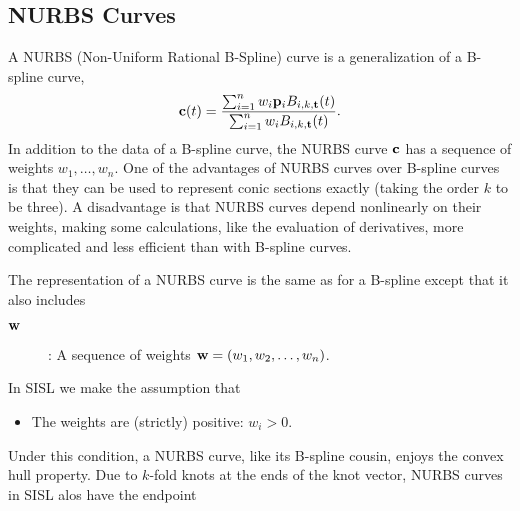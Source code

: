 \subsection{NURBS Curves}

A NURBS (Non-Uniform Rational B-Spline) curve is a generalization
of a B-spline curve,
$$ {\bf c}(t) = {\sum_{i=1}^{n} w_i {\bf p}_{i} B_{i,k,{\bf t}}(t)
                 \over
                 \sum_{i=1}^{n} w_i B_{i,k,{\bf t}}(t)} . $$
In addition to the data of a B-spline curve, the NURBS curve
${\bf c}$ has a sequence of weights $w_1,\ldots,w_n$.
One of the advantages of NURBS curves over B-spline curves is that
they can be used to represent conic sections exactly (taking the
order $k$ to be three).
A disadvantage is that NURBS curves depend nonlinearly on their weights,
making some calculations, like the evaluation of derivatives,
more complicated and less efficient than with B-spline curves.

The representation of a NURBS curve is the same as for a B-spline
except that it also includes
\begin{description}
\item[${\bf w}$]: A sequence of weights
            ${\bf w} = (w_1, w_2, \ldots, w_n)$.
\end{description}

In SISL we make the assumption that
\begin{itemize}
\item The weights are (strictly) positive: $w_i > 0$.
\end{itemize}

Under this condition, a NURBS curve, like its B-spline cousin,
enjoys the convex hull property. 
Due to $k$-fold knots at the ends of the knot vector,
NURBS curves in SISL alos have the endpoint 

